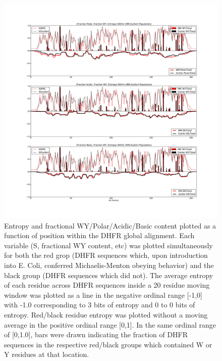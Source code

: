 \documentclass[a4paper,11pt]{article}
\begin{document}
\begin{figure}[h]
\centerline{\includegraphics[width=8in]{AA+S_smooth.pdf}}
\caption[$S_{\rm red}$, $S_{\rm black}$, Moving-Average $S_{\rm red}$, Moving-Average $S_{\rm black}$, WY Content vs Residue \#]{Entropy and fractional WY/Polar/Acidic/Basic content plotted as a function of position within the DHFR global alignment. Each variable (S, fractional WY content, etc) was plotted simultaneously for both the red grop (DHFR sequences which, upon introduction into E. Coli, conferred Michaelis-Menton obeying behavior) and the black group (DHFR sequences which did not). The average entropy of each residue across DHFR sequences inside a 20 residue moving window was plotted as a line in the negative ordinal range [-1,0] with -1.0 corresponding to 3 bits of entropy and 0 to 0 bits of entropy. Red/black residue entropy was plotted without a moving average in the positive ordinal range [0,1]. In the same ordinal range of [0,1.0], bars were drawn indicating the fraction of DHFR sequences in the respective red/black groups which contained W or Y residues at that location.}
\end{figure}
\end{document}
